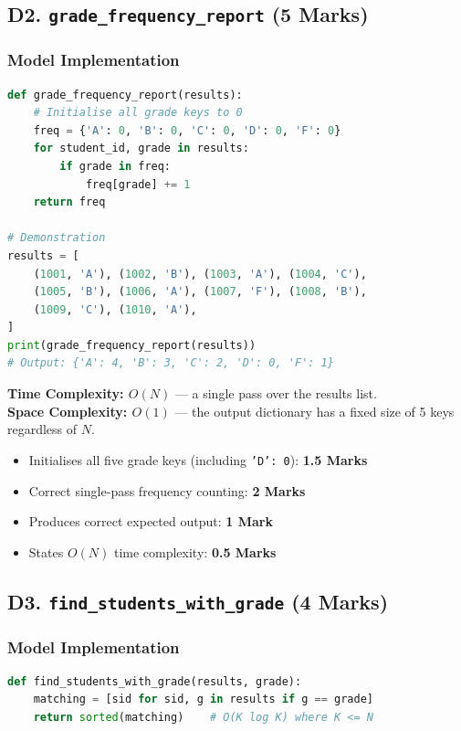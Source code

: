 \documentclass[11pt,a4paper]{article}
\newenvironment{markbox}[1]{%
    \begin{tcolorbox}[colback=markgreen!6!white, colframe=markgreen, title=\textbf{Mark Allocation --- #1}]
}{%
    \end{tcolorbox}
}
\begin{document}
\subsection*{D2. \texttt{grade\_frequency\_report} (5 Marks)}

\subsubsection*{Model Implementation}
\begin{lstlisting}[language=Python]
def grade_frequency_report(results):
    # Initialise all grade keys to 0
    freq = {'A': 0, 'B': 0, 'C': 0, 'D': 0, 'F': 0}
    for student_id, grade in results:
        if grade in freq:
            freq[grade] += 1
    return freq

# Demonstration
results = [
    (1001, 'A'), (1002, 'B'), (1003, 'A'), (1004, 'C'),
    (1005, 'B'), (1006, 'A'), (1007, 'F'), (1008, 'B'),
    (1009, 'C'), (1010, 'A'),
]
print(grade_frequency_report(results))
# Output: {'A': 4, 'B': 3, 'C': 2, 'D': 0, 'F': 1}
\end{lstlisting}

\textbf{Time Complexity: $O(N)$} --- a single pass over the results list. \\
\textbf{Space Complexity: $O(1)$} --- the output dictionary has a fixed size of 5 keys regardless of $N$.

\begin{markbox}{D2 --- 5 Marks}
\begin{itemize}
    \item Initialises all five grade keys (including \texttt{'D': 0}): \textbf{1.5 Marks}
    \item Correct single-pass frequency counting: \textbf{2 Marks}
    \item Produces correct expected output: \textbf{1 Mark}
    \item States $O(N)$ time complexity: \textbf{0.5 Marks}
\end{itemize}
\end{markbox}

\newpage

\subsection*{D3. \texttt{find\_students\_with\_grade} (4 Marks)}

\subsubsection*{Model Implementation}
\begin{lstlisting}[language=Python]
def find_students_with_grade(results, grade):
    matching = [sid for sid, g in results if g == grade]
    return sorted(matching)    # O(K log K) where K <= N
\end{lstlisting}
\end{document}
